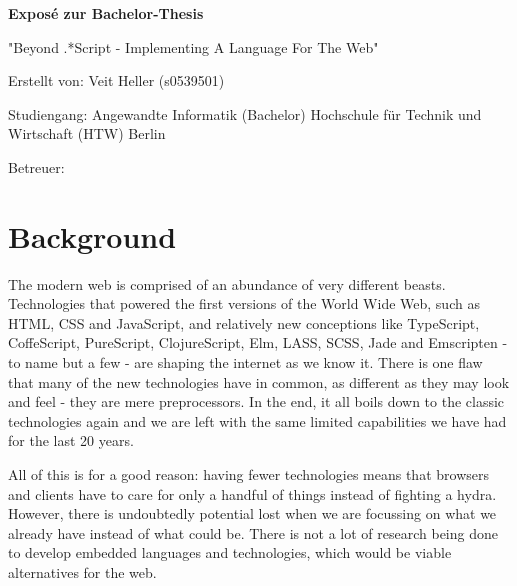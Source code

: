 \documentclass[oneside,11pt,xetex]{scrbook}
\begin{document}
\renewcommand{\thepage}{\roman{page}}

\pagestyle{empty}

\frontmatter

\vspace*{0.4\textheight}

\begin{flushleft}
\Large{\textbf{Exposé zur Bachelor-Thesis}}
\vspace{0.5cm}

\large{"Beyond .*Script - Implementing A Language For The Web"}
\vspace{0.5cm}

Erstellt von: Veit Heller (s0539501)
\vspace{0.1cm}

Studiengang:  Angewandte Informatik (Bachelor)\linebreak
Hochschule für Technik und Wirtschaft (HTW) Berlin
\vspace{0.1cm}

Betreuer:
\end{flushleft}

\date{\today}

\clearpage

\section*{Background}

The modern web is comprised of an abundance of very different beasts. Technologies that powered the first versions of the World Wide Web, such as HTML, CSS and JavaScript, and relatively new conceptions like TypeScript, CoffeScript, PureScript, ClojureScript, Elm, LASS, SCSS, Jade and Emscripten - to name but a few - are shaping the internet as we know it. There is one flaw that many of the new technologies have in common, as different as they may look and feel - they are mere preprocessors. In the end, it all boils down to the classic technologies again and we are left with the same limited capabilities we have had for the last 20 years.

All of this is for a good reason: having fewer technologies means that browsers and clients have to care for only a handful of things instead of fighting a hydra. However, there is undoubtedly potential lost when we are focussing on what we already have instead of what could be. There is not a lot of research being done to develop embedded languages and technologies, which would be viable alternatives for the web.
\end{document}
